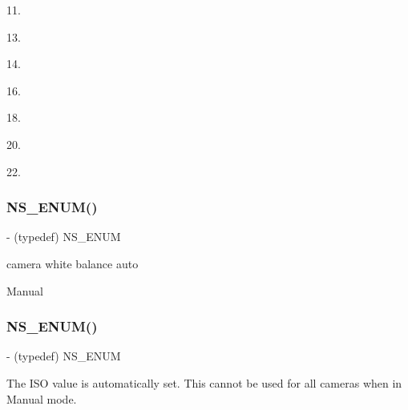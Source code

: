 11.

13.

14.

16.

18.

20.

22.\mbox{\label{interface_p_v_eye_camera_settings_def_a4c609086f7a2330149d80ba8b082779a}} 
\subsubsection{\texorpdfstring{N\+S\+\_\+\+E\+N\+U\+M()}{NS\_ENUM()}\hspace{0.1cm}{\footnotesize\ttfamily [13/17]}}
{\footnotesize\ttfamily -\/ (typedef) N\+S\+\_\+\+E\+N\+UM \begin{DoxyParamCaption}\item[{(N\+S\+Integer)}]{ }\item[{(P\+V\+Eye\+Camera\+White\+Balance\+Mode)}]{ }\end{DoxyParamCaption}}

camera white balance auto

Manual\mbox{\label{interface_p_v_eye_camera_settings_def_aa90cbc3d335fad076905f4702b720aeb}} 
\subsubsection{\texorpdfstring{N\+S\+\_\+\+E\+N\+U\+M()}{NS\_ENUM()}\hspace{0.1cm}{\footnotesize\ttfamily [14/17]}}
{\footnotesize\ttfamily -\/ (typedef) N\+S\+\_\+\+E\+N\+UM \begin{DoxyParamCaption}\item[{(N\+S\+U\+Integer)}]{ }\item[{(P\+V\+Eye\+Camera\+I\+SO)}]{ }\end{DoxyParamCaption}}

The I\+SO value is automatically set. This cannot be used for all cameras when in Manual mode.

